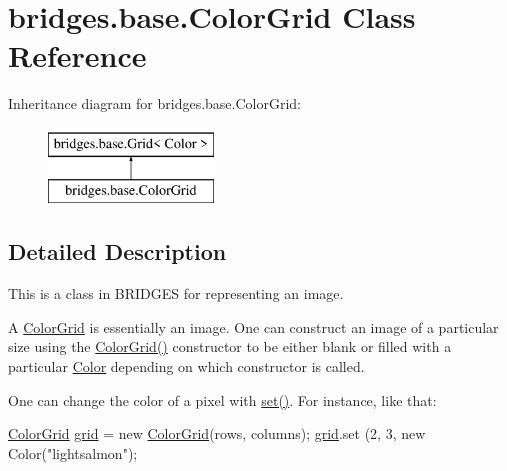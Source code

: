 \hypertarget{classbridges_1_1base_1_1_color_grid}{}\section{bridges.\+base.\+Color\+Grid Class Reference}
\label{classbridges_1_1base_1_1_color_grid}
Inheritance diagram for bridges.\+base.\+Color\+Grid\+:\begin{figure}[H]
\begin{center}
\leavevmode
\includegraphics[height=2.000000cm]{classbridges_1_1base_1_1_color_grid}
\end{center}
\end{figure}


\subsection{Detailed Description}
This is a class in B\+R\+I\+D\+G\+ES for representing an image. 

A \mbox{\hyperlink{classbridges_1_1base_1_1_color_grid}{Color\+Grid}} is essentially an image. One can construct an image of a particular size using the \mbox{\hyperlink{classbridges_1_1base_1_1_color_grid_af434a5a3dcbaf86e51ac6f9e1c1d7e5f}{Color\+Grid()}} constructor to be either blank or filled with a particular \mbox{\hyperlink{classbridges_1_1base_1_1_color}{Color}} depending on which constructor is called.

One can change the color of a pixel with \mbox{\hyperlink{classbridges_1_1base_1_1_grid_ab79ceb737423bb28ea2348e61a625a17}{set()}}. For instance, like that\+: 
\begin{DoxyCode}
\mbox{\hyperlink{classbridges_1_1base_1_1_color_grid_af434a5a3dcbaf86e51ac6f9e1c1d7e5f}{ColorGrid}} \mbox{\hyperlink{classbridges_1_1base_1_1_grid_ad1f3f6968d58188425bd992c05c655a6}{grid}} = \textcolor{keyword}{new} \mbox{\hyperlink{classbridges_1_1base_1_1_color_grid_af434a5a3dcbaf86e51ac6f9e1c1d7e5f}{ColorGrid}}(rows, columns);
\mbox{\hyperlink{classbridges_1_1base_1_1_grid_ad1f3f6968d58188425bd992c05c655a6}{grid}}.set (2, 3, \textcolor{keyword}{new} Color(\textcolor{stringliteral}{"lightsalmon"});
\end{DoxyCode}


